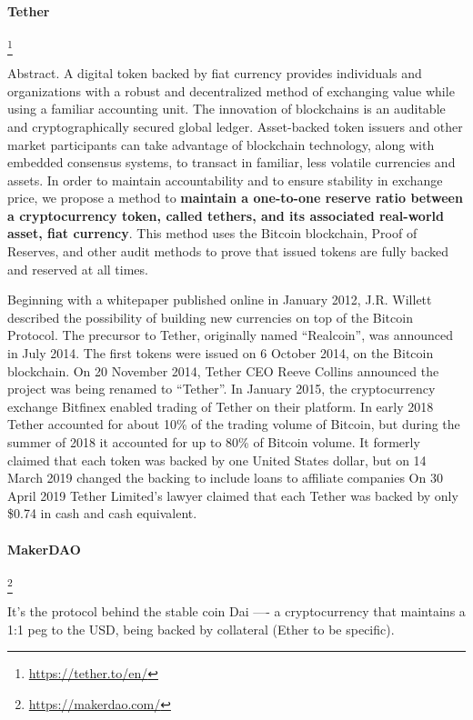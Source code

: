 \paragraph{Tether}\footnote{\url{https://tether.to/en/}}

Abstract. A digital token backed by fiat currency provides individuals and organizations with a robust and decentralized method of exchanging value while using a familiar accounting unit. The innovation of blockchains is an auditable and cryptographically secured global ledger. Asset-backed token issuers and other market participants can take advantage of blockchain technology, along with embedded consensus systems, to transact in familiar, less volatile currencies and assets. In order to maintain accountability and to ensure stability in exchange price, we propose a method to \textbf{maintain a one-to-one reserve ratio between a cryptocurrency token, called tethers, and its associated real-world asset, fiat currency}. This method uses the Bitcoin blockchain, Proof of Reserves, and other audit methods to prove that issued tokens are fully backed and reserved at all times.

Beginning with a whitepaper published online in January 2012, J.R. Willett described the possibility of building new currencies on top of the Bitcoin Protocol.
The precursor to Tether, originally named ``Realcoin'', was announced in July 2014. The first tokens were issued on 6 October 2014, on the Bitcoin blockchain.
On 20 November 2014, Tether CEO Reeve Collins announced the project was being renamed to ``Tether''.
In January 2015, the cryptocurrency exchange Bitfinex enabled trading of Tether on their platform.
In early 2018 Tether accounted for about 10\% of the trading volume of Bitcoin, but during the summer of 2018 it accounted for up to 80\% of Bitcoin volume.
It formerly claimed that each token was backed by one United States dollar, but on 14 March 2019 changed the backing to include loans to affiliate companies
On 30 April 2019 Tether Limited's lawyer claimed that each Tether was backed by only \$0.74 in cash and cash equivalent.

\paragraph{MakerDAO}\footnote{\url{https://makerdao.com/}}

It's the protocol behind the stable coin Dai —- a cryptocurrency that maintains a 1:1 peg to the USD, being backed by collateral (Ether to be specific).

